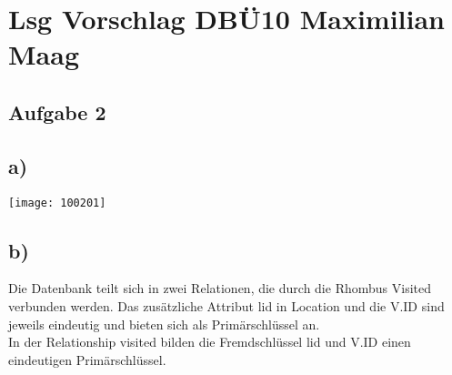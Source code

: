 \documentclass{article}
\begin{document}
	
	\section*{Lsg Vorschlag DBÜ10 Maximilian Maag}
	\subsection*{Aufgabe 2}
	\subsection*{a)}
	\texttt{[image: 100201]}
	\subsection*{b)}
	Die Datenbank teilt sich in zwei Relationen, die durch die Rhombus Visited verbunden werden. Das zusätzliche Attribut lid in Location und die V.ID sind jeweils eindeutig und bieten sich als Primärschlüssel an. \\
	In der Relationship visited bilden die Fremdschlüssel lid und V.ID einen eindeutigen Primärschlüssel.
\end{document}
